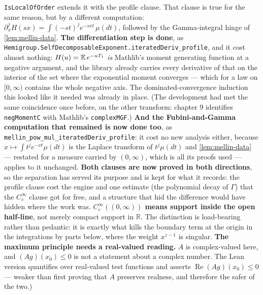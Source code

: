 \begin{definition}
{\texttt{IsLocalOfOrder} extends it with the profile clause. That clause is true for the same
reason, but by a different computation: $\partial_x^j H(sx) = \int (-st)^j e^{-sxt}\,\mu(dt)$,
followed by the Gamma-integral hinge of \ref{lem:mellin-data}.
\textbf{The differentiation step is done}, as
\texttt{Hemigroup.SelfDecomposableExponent.iteratedDeriv\_profile}, and it cost almost nothing:
$H(u) = \mathbb{E}\,e^{-uT_1}$ \emph{is} Mathlib's moment generating function at a negative argument, and
the library already carries every derivative of that on the interior of the set where the
exponential moment converges --- which for a law on $[0,\infty)$ contains the whole negative
axis. The dominated-convergence induction this looked like it needed was already in place. (The
development had met the same coincidence once before, on the other transform: chapter 9
identifies \texttt{negMomentC} with Mathlib's \texttt{complexMGF}.) \textbf{And the
Fubini-and-Gamma computation that remained is now done too}, as
\texttt{mellin\_pow\_mul\_iteratedDeriv\_profile}: it cost no new analysis either, because
$x \mapsto \int t^j e^{-xt}\mu(dt)$ is the Laplace transform of $t^j\mu(dt)$ and
\ref{lem:mellin-data} --- restated for a measure carried by $(0,\infty)$, which is all its proofs
used --- applies to it unchanged. \textbf{Both clauses are now proved in both directions}, so the
separation has served its purpose and is kept for what it records: the profile clause cost the
engine and one estimate (the polynomial decay of $\Gamma$) that the $C_c^\infty$ clause got for
free, and a structure that hid the difference would have hidden where the work was.
\textbf{$C_c^\infty((0,\infty))$ means support inside the open half-line}, not merely compact
support in $\mathbb{R}$. The distinction is load-bearing rather than pedantic: it is exactly what
kills the boundary term at the origin in the integrations by parts below, where the weight
$x^{z-1}$ is singular.
\textbf{The maximum principle needs a real-valued reading.} $A$ is complex-valued here, and
$(Ag)(x_0) \le 0$ is not a statement about a complex number. The Lean version quantifies over
real-valued test functions and asserts $\operatorname{Re}(Ag)(x_0) \le 0$ --- weaker than first
proving that $A$ preserves realness, and therefore the safer of the two.)}
\end{definition}

